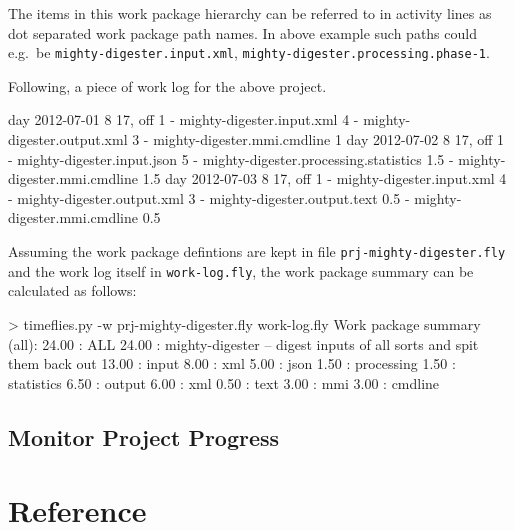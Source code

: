 \documentclass[11pt]{article}
\begin{document}
The items in this work package hierarchy can be referred to in activity lines as dot separated work package path names. In above example such paths could e.g.\ be \verb:mighty-digester.input.xml:, \verb:mighty-digester.processing.phase-1:.

Following, a piece of work log for the above project.

\begin{inputfile}
day 2012-07-01 8 17, off 1
- mighty-digester.input.xml 4
- mighty-digester.output.xml 3
- mighty-digester.mmi.cmdline 1
day 2012-07-02 8 17, off 1
- mighty-digester.input.json 5
- mighty-digester.processing.statistics 1.5
- mighty-digester.mmi.cmdline 1.5
day 2012-07-03 8 17, off 1
- mighty-digester.input.xml 4
- mighty-digester.output.xml 3
- mighty-digester.output.text 0.5
- mighty-digester.mmi.cmdline 0.5
\end{inputfile}

Assuming the work package defintions are kept in file \verb:prj-mighty-digester.fly: and the work log itself in \verb:work-log.fly:, the work package summary can be calculated as follows:

\begin{inputfile}
> timeflies.py -w prj-mighty-digester.fly work-log.fly 
Work package summary (all):
 24.00 : ALL
     24.00 : mighty-digester -- digest inputs of all sorts and spit them back out
         13.00 : input
              8.00 : xml
              5.00 : json
          1.50 : processing
              1.50 : statistics
          6.50 : output
              6.00 : xml
              0.50 : text
          3.00 : mmi
              3.00 : cmdline
\end{inputfile}


\subsection{Monitor Project Progress}

\section{Reference}
\end{document}
